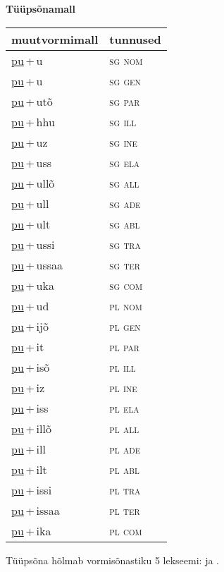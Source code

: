 
\vspace{1.8em}
\begin{minipage}{\textwidth}
\textbf{Tüüpsõnamall \,}\\

\begin{sideways}
\begin{tabular}{l l}
muutvormimall & tunnused \\
\hline
\underline{pu}\,+\,u & \textsc{ sg nom } \\
\underline{pu}\,+\,u & \textsc{ sg gen } \\
\underline{pu}\,+\,utõ & \textsc{ sg par } \\
\underline{pu}\,+\,hhu & \textsc{ sg ill } \\
\underline{pu}\,+\,uz & \textsc{ sg ine } \\
\underline{pu}\,+\,uss & \textsc{ sg ela } \\
\underline{pu}\,+\,ullõ & \textsc{ sg all } \\
\underline{pu}\,+\,ull & \textsc{ sg ade } \\
\underline{pu}\,+\,ult & \textsc{ sg abl } \\
\underline{pu}\,+\,ussi & \textsc{ sg tra } \\
\underline{pu}\,+\,ussaa & \textsc{ sg ter } \\
\underline{pu}\,+\,uka & \textsc{ sg com } \\
\underline{pu}\,+\,ud & \textsc{ pl nom } \\
\underline{pu}\,+\,ijõ & \textsc{ pl gen } \\
\underline{pu}\,+\,it & \textsc{ pl par } \\
\underline{pu}\,+\,isõ & \textsc{ pl ill } \\
\underline{pu}\,+\,iz & \textsc{ pl ine } \\
\underline{pu}\,+\,iss & \textsc{ pl ela } \\
\underline{pu}\,+\,illõ & \textsc{ pl all } \\
\underline{pu}\,+\,ill & \textsc{ pl ade } \\
\underline{pu}\,+\,ilt & \textsc{ pl abl } \\
\underline{pu}\,+\,issi & \textsc{ pl tra } \\
\underline{pu}\,+\,issaa & \textsc{ pl ter } \\
\underline{pu}\,+\,ika & \textsc{ pl com } \\
\end{tabular}
\end{sideways}
\label{tab:tüüpsõnamall-puu}

\end{minipage}

 
\vspace{1em}
\noindent Tüüpsõna hõlmab vormisõnastiku 5 lekseemi:  ja .
